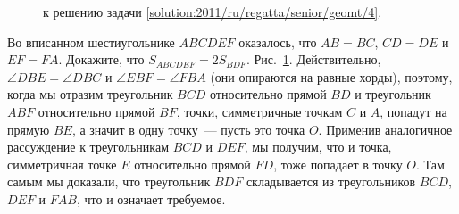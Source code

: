 \ifsolution
\begin{figure}\centering
    \caption{к решению задачи \ref{solution:2011/ru/regatta/senior/geomt/4}.}
    \label{fig:solution:2011/ru/regatta/senior/geomt/4}
\end{figure}
\fi %

\problem
Во вписанном шестиугольнике $ABCDEF$ оказалось, что
$AB = BC$, $CD = DE$ и $EF = FA$.
Докажите, что $S_{ABCDEF} = 2 S_{BDF}$.
\solution
\label{solution:2011/ru/regatta/senior/geomt/4}%
Рис.~\ref{fig:solution:2011/ru/regatta/senior/geomt/4}.
Действительно, $\angle DBE = \angle DBC$ и $\angle EBF = \angle FBA$
(они опираются на равные хорды),
поэтому, когда мы отразим треугольник $BCD$ относительно прямой $BD$ и
треугольник $ABF$ относительно прямой $BF$, точки, симметричные точкам $C$ и
$A$, попадут на прямую $BE$, а значит в одну точку~--- пусть это точка $O$.
Применив аналогичное рассуждение к треугольникам $BCD$ и $DEF$, мы получим, что
и точка, симметричная точке $E$ относительно прямой $FD$, тоже попадает в точку
$O$.
Там самым мы доказали, что треугольник $BDF$ складывается из треугольников
$BCD$, $DEF$ и $FAB$, что и означает требуемое.
\endproblem
